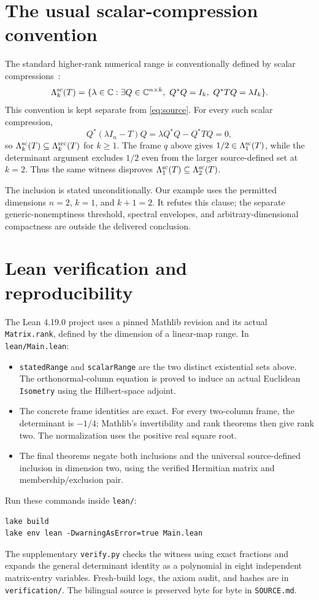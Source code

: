 \documentclass[11pt]{article}
\begin{document}
\newpage
\section{The usual scalar-compression convention}
The standard higher-rank numerical range is conventionally defined by
scalar compressions~\cite{CKZ}:
\[
 \Lambda^{\rm sc}_k(T)=\{\lambda\in\mathbb C:
   \exists Q\in\mathbb C^{n\times k},\ Q^*Q=I_k,\ Q^*TQ=\lambda I_k\}.
\]
This convention is kept separate from \eqref{eq:source}. For every such
scalar compression,
\[
 Q^*(\lambda I_n-T)Q
 =\lambda Q^*Q-Q^*TQ=0,
\]
so $\Lambda^{\rm sc}_k(T)\subseteq\Lambda^{\rm src}_k(T)$ for $k\geq1$.
The frame $q$ above gives $1/2\in\Lambda^{\rm sc}_1(T)$, while the
determinant argument excludes $1/2$ even from the larger source-defined
set at $k=2$. Thus the same witness disproves
$\Lambda^{\rm sc}_1(T)\subseteq\Lambda^{\rm sc}_2(T)$.

The inclusion is stated unconditionally. Our example uses the permitted
dimensions $n=2$, $k=1$, and $k+1=2$. It refutes this clause; the separate
generic-nonemptiness threshold, spectral envelopes, and arbitrary-dimensional
compactness are outside the delivered conclusion.

\section{Lean verification and reproducibility}
The Lean 4.19.0 project uses a pinned Mathlib revision and its actual
\texttt{Matrix.rank}, defined by the dimension of a linear-map range.
In \texttt{lean/Main.lean}:
\begin{itemize}
\item \texttt{statedRange} and \texttt{scalarRange} are the two distinct
existential sets above. The orthonormal-column equation is proved to induce
an actual Euclidean \texttt{Isometry} using the Hilbert-space adjoint.
\item The concrete frame identities are exact. For every two-column frame,
the determinant is $-1/4$; Mathlib's invertibility and rank theorems then
give rank two. The normalization uses the positive real square root.
\item The final theorems negate both inclusions and the universal
source-defined inclusion in dimension two, using the verified Hermitian
matrix and membership/exclusion pair.
\end{itemize}
Run these commands inside \texttt{lean/}:
\begin{verbatim}
lake build
lake env lean -DwarningAsError=true Main.lean
\end{verbatim}
The supplementary \texttt{verify.py} checks the witness using exact
fractions and expands the general determinant identity as a polynomial
in eight independent matrix-entry variables. Fresh-build logs, the axiom
audit, and hashes are in \texttt{verification/}. The bilingual source is
preserved byte for byte in \texttt{SOURCE.md}.
\end{document}
